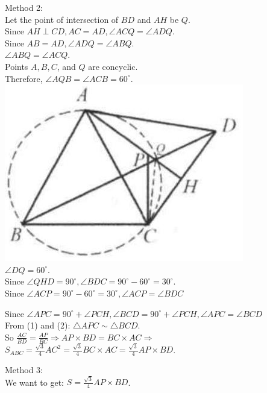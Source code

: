 \documentclass[10pt]{article}
\begin{document}
Method 2:\\
Let the point of intersection of \(B D\) and \(A H\) be \(Q\).\\
Since \(A H \perp C D, A C=A D, \angle A C Q=\angle A D Q\).\\
Since \(A B=A D, \angle A D Q=\angle A B Q\).\\
\(\angle A B Q=\angle A C Q\).\\
Points \(A, B, C\), and \(Q\) are concyclic.\\
Therefore, \(\angle A Q B=\angle A C B=60^{\circ}\).\\
\includegraphics[max width=\textwidth, center]{2025_04_17_97bc1f7e44d93c271a88g-200}\\
\(\angle D Q=60^{\circ}\).\\
Since \(\angle Q H D=90^{\circ}, \angle B D C=90^{\circ}-60^{\circ}=30^{\circ}\).\\
Since \(\angle A C P=90^{\circ}-60^{\circ}=30^{\circ}, \angle A C P=\angle B D C\)

Since \(\angle A P C=90^{\circ}+\angle P C H, \angle B C D=90^{\circ}+\angle P C H, \angle A P C=\angle B C D\)\\
From (1) and (2): \(\triangle A P C \sim \triangle B C D\).\\
So \(\frac{A C}{B D}=\frac{A P}{B C} \Rightarrow A P \times B D=B C \times A C \Rightarrow\)\\
\(S_{A B C}=\frac{\sqrt{3}}{4} A C^{2}=\frac{\sqrt{3}}{4} B C \times A C=\frac{\sqrt{3}}{4} A P \times B D\).

Method 3:\\
We want to get: \(S=\frac{\sqrt{3}}{4} A P \times B D\).
\end{document}
